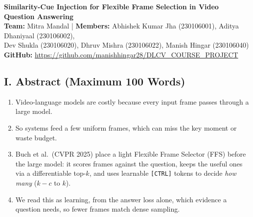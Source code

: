 \documentclass[8pt,a4paper]{article}
\begin{document}
\thispagestyle{empty}

\begin{center}

{\large\bfseries
Similarity-Cue Injection for Flexible Frame Selection in Video Question Answering}\\[4pt]

\textbf{Team:} Mitra Mandal
\quad | \quad
\textbf{Members:}
Abhishek Kumar Jha (230106001), Aditya Dhaniyaal (230106002),\\[2pt]
Dev Shukla (230106020), Dhruv Mishra (230106022), Manish Hingar (230106040)\\[3pt]

\textbf{GitHub:}
\url{https://github.com/manishhingar28/DLCV_COURSE_PROJECT}

\end{center}

\vspace{-5pt}

\subsection*{I. Abstract (Maximum 100 Words)}
\begin{enumerate}
    \item Video-language models are costly because every input frame passes through a large model.
    \item So systems feed a few uniform frames, which can miss the key moment or waste budget.
    \item Buch et al.\ (CVPR 2025) place a light Flexible Frame Selector (FFS) before the large model: it scores frames against the question, keeps the useful ones via a differentiable top-$k$, and uses learnable \texttt{[CTRL]} tokens to decide \emph{how many} ($k{-}c$ to $k$).
    \item We read this as learning, from the answer loss alone, which evidence a question needs, so fewer frames match dense sampling.
\end{enumerate}

\end{document}

